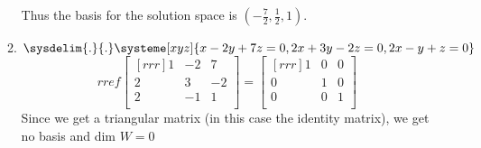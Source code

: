 \documentclass[12pt]{article}
\begin{document}
\begin{enumerate}
\begin{enumerate}
		Thus the basis for the solution space is $(-\frac{7}{2},\frac{1}{2},1)$.
	\item $\sysdelim{.}{.}\systeme[xyz]{x-2y+7z=0,2x+3y-2z=0,2x-y+z=0}$\\
		\[ rref\begin{bmatrix}[rrr]1&-2&7\\2&3&-2\\2&-1&1\\\end{bmatrix}=\begin{bmatrix}[rrr]1&0&0\\0&1&0\\0&0&1\\\end{bmatrix} \]
		Since we get a triangular matrix (in this case the identity matrix), we get no basis and dim $W=0$
		

\end{enumerate}
\end{enumerate}
\end{document}
